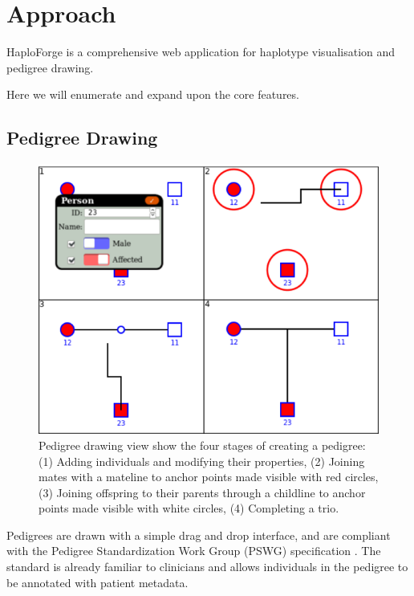 \documentclass{bioinfo}
\numberwithin{equation}{section}
\def\haplo{{HaploForge}}
\begin{document}

\section{Approach}

\haplo{} is a comprehensive web application for haplotype visualisation and pedigree drawing.\

Here we will enumerate and expand upon the core features.

\subsection{Pedigree Drawing}

\begin{figure}[!tpb]
	\centerline{\includegraphics[scale=1]{pedcreate.4.eps}}\caption{Pedigree drawing view show the four stages of creating a pedigree: (1) Adding individuals and modifying their properties, (2) Joining mates with a mateline to anchor points made visible with red circles, (3) Joining offspring to their parents through a childline to anchor points made visible with white circles, (4) Completing a trio.}\label{fig:pedcreate}
\end{figure}
	
Pedigrees are drawn with a simple drag and drop interface, and are compliant with the Pedigree Standardization Work Group (PSWG) specification \citep{pswg1,pswg2}. The standard is already familiar to clinicians and allows individuals in the pedigree to be annotated with patient metadata. 
\end{document}
